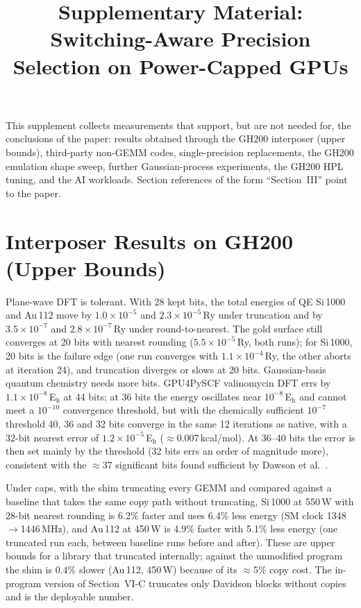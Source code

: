 \documentclass[conference]{IEEEtran}
\newcommand{\W}{\,W}
\newcommand{\Eh}{\,E$_\mathrm{h}$}
\newcommand{\Ry}{\,Ry}
\newcommand{\ee}[2]{#1{\times}10^{#2}}  %
\newcommand{\pct}{\%}
\begin{document}
\renewcommand{\thetable}{S\arabic{table}}
\renewcommand{\thefigure}{S\arabic{figure}}
\renewcommand{\thesection}{S\arabic{section}}

\title{Supplementary Material: Switching-Aware Precision Selection on Power-Capped GPUs}
\author{}
\maketitle

This supplement collects measurements that support, but are not needed for, the conclusions of the paper: results
obtained through the GH200 interposer (upper bounds), third-party non-GEMM codes, single-precision replacements, the
GH200 emulation shape sweep, further Gaussian-process experiments, the GH200 HPL tuning, and the AI workloads. Section
references of the form ``Section~III'' point to the paper.

\section{Interposer Results on GH200 (Upper Bounds)}\label{sec:sci}

Plane-wave DFT is tolerant. With 28 kept bits, the total energies of QE Si\,1000 and Au\,112 move by
$\ee{1.0}{-5}$ and $\ee{2.3}{-5}$\Ry{} under truncation and by $\ee{3.5}{-7}$ and $\ee{2.8}{-7}$\Ry{} under
round-to-nearest. The gold surface still converges at 20 bits with nearest rounding ($\ee{5.5}{-5}$\Ry, both runs);
for Si\,1000, 20 bits is the failure edge (one run converges with $\ee{1.1}{-4}$\Ry, the other aborts at iteration
24), and truncation diverges or slows at 20 bits. Gaussian-basis quantum chemistry needs more bits. GPU4PySCF
valinomycin DFT errs by $\ee{1.1}{-8}$\Eh{} at 44 bits; at 36 bits the energy oscillates near $10^{-8}$\Eh{} and
cannot meet a $10^{-10}$ convergence threshold, but with the chemically sufficient $10^{-7}$ threshold 40, 36 and 32
bits converge in the same 12 iterations as native, with a 32-bit nearest error of $\ee{1.2}{-5}$\Eh{}
($\approx$0.007\,kcal/mol). At 36--40 bits the error is then set mainly by the threshold (32 bits errs an order of
magnitude more), consistent with the $\approx$37 significant bits found sufficient by Dawson et
al.~\cite{Dawson2024}.

Under caps, with the shim truncating every GEMM and compared against a baseline that takes the same copy path
without truncating, Si\,1000 at 550\W{} with 28-bit nearest rounding is 6.2\pct{} faster and uses 6.4\pct{} less
energy (SM clock 1348$\to$1446\,MHz), and Au\,112 at 450\W{} is 4.9\pct{} faster with 5.1\pct{} less energy (one
truncated run each, between baseline runs before and after).
These are upper bounds for a library that truncated internally; against the unmodified program the shim is
0.4\pct{} slower (Au\,112, 450\W) because of its $\approx$5\pct{} copy cost. The in-program version of
Section~VI-C truncates only Davidson blocks without copies and is the deployable number.
\end{document}
